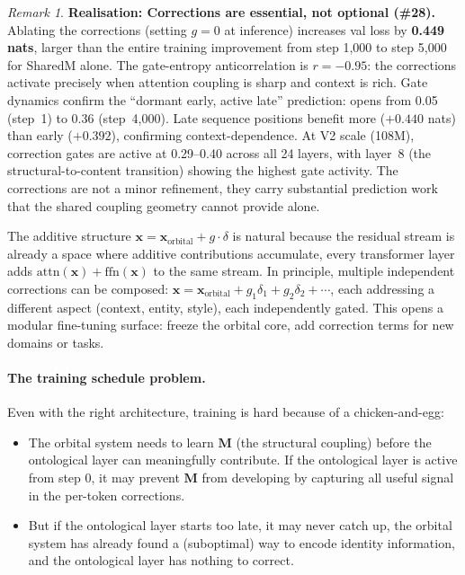 \documentclass[11pt, a4paper]{article}
\newcommand{\M}{\mathbf{M}}
\newcommand{\x}{\mathbf{x}}
\theoremstyle{remark}
\newtheorem*{remark}{Remark}
\begin{document}
\begin{remark}
\textbf{Realisation: Corrections are essential, not optional (\#28).}
Ablating the corrections (setting $g{=}0$ at inference) increases val loss by \textbf{0.449 nats}, larger than the entire training improvement from step 1,000 to step 5,000 for SharedM alone.
The gate-entropy anticorrelation is $r = -0.95$: the corrections activate precisely when attention coupling is sharp and context is rich.
Gate dynamics confirm the ``dormant early, active late'' prediction: opens from 0.05 (step~1) to 0.36 (step~4,000).
Late sequence positions benefit more ($+0.440$ nats) than early ($+0.392$), confirming context-dependence.
At V2 scale (108M), correction gates are active at 0.29--0.40 across all 24 layers, with layer~8 (the structural-to-content transition) showing the highest gate activity.
The corrections are not a minor refinement, they carry substantial prediction work that the shared coupling geometry cannot provide alone.
\end{remark}

The additive structure $\x = \x_{\text{orbital}} + g \cdot \delta$ is natural because the residual stream is already a space where additive contributions accumulate, every transformer layer adds $\text{attn}(\x) + \text{ffn}(\x)$ to the same stream.
In principle, multiple independent corrections can be composed: $\x = \x_{\text{orbital}} + g_1 \delta_1 + g_2 \delta_2 + \cdots$, each addressing a different aspect (context, entity, style), each independently gated.
This opens a modular fine-tuning surface: freeze the orbital core, add correction terms for new domains or tasks.

\paragraph{The training schedule problem.}
Even with the right architecture, training is hard because of a chicken-and-egg:

\begin{itemize}[nosep]
    \item The orbital system needs to learn $\M$ (the structural coupling) before the ontological
          layer can meaningfully contribute.
          If the ontological layer is active from step 0, it may prevent $\M$ from developing
          by capturing all useful signal in the per-token corrections.
    \item But if the ontological layer starts too late, it may never catch up, the orbital
          system has already found a (suboptimal) way to encode identity information,
          and the ontological layer has nothing to correct.
\end{itemize}
\end{document}
